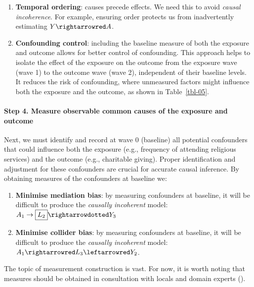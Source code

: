 \documentclass[
  singlecolumn]{article}
\let\oldparagraph\paragraph
\renewcommand{\paragraph}[1]{\oldparagraph{#1}\mbox{}}
\begin{document}
\begin{enumerate}
\def\labelenumi{\arabic{enumi}.}
\item
  \textbf{Temporal ordering}: causes precede effects. We need this to
  avoid \emph{causal incoherence}. For example, ensuring order protects
  us from inadvertently estimating \(Y\rightarrowred A\).
\item
  \textbf{Confounding control}: including the baseline measure of both
  the exposure and outcome allows for better control of confounding.
  This approach helps to isolate the effect of the exposure on the
  outcome from the exposure wave (wave 1) to the outcome wave (wave 2),
  independent of their baseline levels. It reduces the risk of
  confounding, where unmeasured factors might influence both the
  exposure and the outcome, as shown in Table~\ref{tbl-05}.
\end{enumerate}

\paragraph{Step 4. Measure observable common causes of the exposure and
outcome}\label{step-4.-measure-observable-common-causes-of-the-exposure-and-outcome}

Next, we must identify and record at wave 0 (baseline) all potential
confounders that could influence both the exposure (e.g., frequency of
attending religious services) and the outcome (e.g., charitable giving).
Proper identification and adjustment for these confounders are crucial
for accurate causal inference. By obtaining measures of the confounders
at baseline we:

\begin{enumerate}
\def\labelenumi{\alph{enumi}.}
\item
  \textbf{Minimise mediation bias}: by measuring confounders at
  baseline, it will be difficult to produce the \emph{causally
  incoherent} model: \(A_1\to \boxed{L_2} \rightarrowdotted Y_3\)
\item
  \textbf{Minimise collider bias}: by measuring confounders at baseline,
  it will be difficult to produce the \emph{causally incoherent} model:
  \(A_1\rightarrowred L_3 \leftarrowred Y_2\).
\end{enumerate}

The topic of measurement construction is vast. For now, it is worth
noting that measures should be obtained in consultation with locals and
domain experts ().
\end{document}

